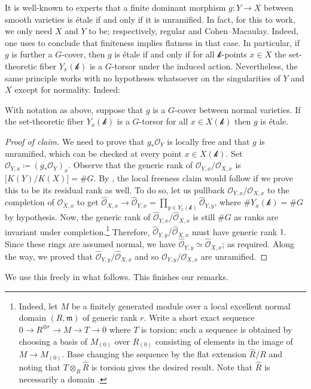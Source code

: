 \documentclass[12pt]{amsart}
\theoremstyle{plain}   %
\theoremstyle{definition}    %
\theoremstyle{remark}    %
\numberwithin{equation}{theorem}
\newcommand{\kay}{\mathcal{k}}
\newcommand{\sO}{\mathcal{O}}
\newcommand{\fram}{\mathfrak{m}}
\begin{document}
\begin{remark}
It is well-known to experts that a finite dominant morphism $g\colon Y \to X$ between smooth varieties is \'etale if and only if it is unramified. In fact, for this to work, we only need $X$ and $Y$ to be; respectively, regular and Cohen--Macaulay. Indeed, one uses \cite[Corollary 18.17]{EisenbudCommutativeAlgebraWithAView} to conclude that finiteness implies flatness in that case. In particular, if $g$ is further a $G$-cover, then $g$ is \'etale if and only if for all $\kay$-points $x\in X$ the set-theoretic fiber $Y_x(\kay)$ is a $G$-torsor under the induced action. Nevertheless, the same principle works with no hypotheses whatsoever on the singularities of $Y$ and $X$ except for normality. Indeed:
\begin{claim} \label{claim:NatureOfEtaleNessGCovers}
With notation as above, suppose that $g$ is a $G$-cover between normal varieties. If the set-theoretic fiber $Y_x(\kay)$ is a $G$-torsor for all $x \in X(\kay)$ then $g$ is \'etale.
\end{claim}
\begin{proof}[Proof of claim]
We need to prove that $g_* \sO_Y$ is locally free and that $g$ is unramified, which can be checked at every point $x \in X(\kay)$. Set $\sO_{Y,x} \coloneqq (g_* \sO_Y)_x$. Observe that the generic rank of $\sO_{Y,x}/\sO_{X,x}$ is $\big[K(Y)/K(X)\big] = \# G$. By \cite[II, Lemma 8.9]{Hartshorne}, the local freeness claim would follow if we prove this to be its residual rank as well. To do so, let us pullback $\sO_{Y,x}/\sO_{X,x}$ to the completion of $\sO_{X,x}$ to get $\hat{\sO}_{X,x} \to \hat{\sO}_{Y,x} = \prod_{y \in Y_x(\kay)} \hat{\sO}_{Y,y}$, where $\# Y_x(\kay) = \# G$ by hypothesis. Now, the generic rank of $\hat{\sO}_{Y,x}/\hat{\sO}_{X,x}$ is still $\# G$ as ranks are invariant under completion.\footnote{Indeed, let $M$ be a finitely generated module over a local excellent normal domain $(R,\fram)$ of generic rank $r$. Write a short exact sequence $0 \to R^{\oplus r} \to M \to T \to 0$ where $T$ is torsion; such a sequence is obtained by choosing a basis of $M_{(0)}$ over $R_{(0)}$ consisting of elements in the image of $M \to M_{(0)}$. Base changing the sequence by the flat extension $\hat{R}/R$ and noting that $T \otimes_R \hat{R}$ is torsion gives the desired result. Note that $\hat{R}$ is necessarily a domain \cite[\href{https://stacks.math.columbia.edu/tag/0C23}{Tag 0C23}]{stacks-project}.} Therefore, $\hat{\sO}_{Y,y}/\hat{\sO}_{X,x}$ must have generic rank $1$. Since these rings are assumed normal, we have $\hat{\sO}_{Y,y}\simeq \hat{\sO}_{X,x}$; as required. Along the way, we proved that $\hat{\sO}_{Y,y}/\hat{\sO}_{X,x}$ and so $\sO_{Y,y}/\sO_{X,x}$ are unramified.
\end{proof}
We use this freely in what follows. This finishes our remarks.
\end{remark}
\end{document}
